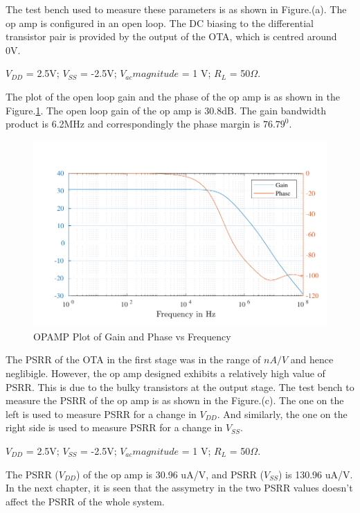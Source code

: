 The test bench used to measure these parameters is as shown in Figure.(a). The op amp is configured in an open loop. The DC biasing to the differential transistor pair is provided by the output of the OTA, which is centred around 0V. 

$V_{DD}$ = 2.5V; $V_{SS}$ = -2.5V; $V_{ac} magnitude $ = 1 V; $R_L$ = 50$\Omega$.

The plot of the open loop gain and the phase of the op amp is as shown in the Figure.\ref{fig:OPAMP_gain_pm_gbw}. The open loop gain of the op amp is 30.8dB. The gain bandwidth product is 6.2MHz and correspondingly the phase margin is $76.79^0$.

\begin{figure} [H]
\centering
\includegraphics[scale=1]{Figures/Plots/OPAMP_Gain_PM.pdf}
\caption{OPAMP Plot of Gain and Phase vs Frequency}
\label{fig:OPAMP_gain_pm_gbw}
\end{figure}

The PSRR of the OTA in the first stage was in the range of $nA/V$ and hence neglibigle. However, the op amp designed exhibits a relatively high value of PSRR. This is due to the bulky transistors at the output stage. The test bench to measure the PSRR of the op amp is as shown in the Figure.(c). The one on the left is used to measure PSRR for a change in $V_{DD}$. And similarly, the one on the right side is used to measure PSRR for a change in $V_{SS}$.

$V_{DD}$ = 2.5V; $V_{SS}$ = -2.5V; $V_{ac} magnitude $ = 1 V; $R_L$ = 50$\Omega$.

The PSRR ($V_{DD}$) of the op amp is 30.96 uA/V, and PSRR ($V_{SS}$) is 130.96 uA/V. In the next chapter, it is seen that the assymetry in the two PSRR values doesn't affect the PSRR of the whole system.

